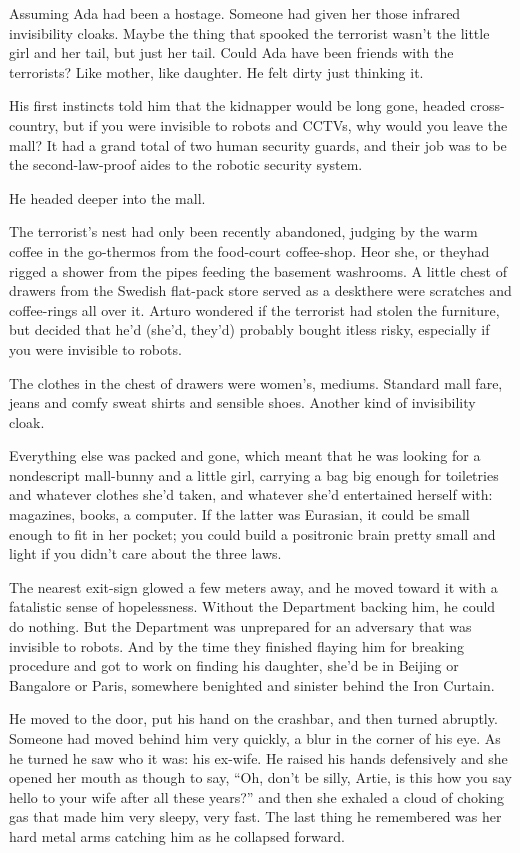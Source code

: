 Assuming Ada had been a hostage. Someone had given her those
infrared invisibility cloaks. Maybe the thing that spooked the
terrorist wasn’t the little girl and her tail, but just her tail.
Could Ada have been friends with the terrorists? Like mother, like
daughter. He felt dirty just thinking it.

His first instincts told him that the kidnapper would be long gone,
headed cross-country, but if you were invisible to robots and
CCTVs, why would you leave the mall? It had a grand total of two
human security guards, and their job was to be the second-law-proof
aides to the robotic security system.

He headed deeper into the mall.

\tb

The terrorist’s nest had only been recently abandoned, judging by
the warm coffee in the go-thermos from the food-court coffee-shop.
He{\dash}or she, or they{\dash}had rigged a shower from the pipes feeding the
basement washrooms. A little chest of drawers from the Swedish
flat-pack store served as a desk{\dash}there were scratches and
coffee-rings all over it. Arturo wondered if the terrorist had
stolen the furniture, but decided that he’d (she’d, they’d)
probably bought it{\dash}less risky, especially if you were invisible to
robots.

The clothes in the chest of drawers were women’s, mediums. Standard
mall fare, jeans and comfy sweat shirts and sensible shoes. Another
kind of invisibility cloak.

Everything else was packed and gone, which meant that he was
looking for a nondescript mall-bunny and a little girl, carrying a
bag big enough for toiletries and whatever clothes she’d taken, and
whatever she’d entertained herself with: magazines, books, a
computer. If the latter was Eurasian, it could be small enough to
fit in her pocket; you could build a positronic brain pretty small
and light if you didn’t care about the three laws.

The nearest exit-sign glowed a few meters away, and he moved toward
it with a fatalistic sense of hopelessness. Without the Department
backing him, he could do nothing. But the Department was unprepared
for an adversary that was invisible to robots. And by the time they
finished flaying him for breaking procedure and got to work on
finding his daughter, she’d be in Beijing or Bangalore or Paris,
somewhere benighted and sinister behind the Iron Curtain.

He moved to the door, put his hand on the crashbar, and then turned
abruptly. Someone had moved behind him very quickly, a blur in the
corner of his eye. As he turned he saw who it was: his ex-wife. He
raised his hands defensively and she opened her mouth as though to
say, “Oh, don’t be silly, Artie, is this how you say hello to your
wife after all these years?” and then she exhaled a cloud of
choking gas that made him very sleepy, very fast. The last thing he
remembered was her hard metal arms catching him as he collapsed
forward.

